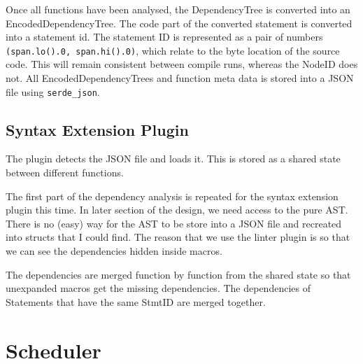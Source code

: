 Once all functions have been analysed, the DependencyTree is converted into an EncodedDependencyTree. The code part of the converted statement is converted into a statement id. The statement ID is represented as a pair of numbers \texttt{(span.lo().0, span.hi().0)}, which relate to the byte location of the source code. This will remain consistent between compile runs, whereas the NodeID does not. All EncodedDependencyTrees and function meta data is stored into a JSON file using \texttt{serde\_json}.


\subsection{Syntax Extension Plugin}

The plugin detects the JSON file and loads it. This is stored as a shared state between different functions.

The first part of the dependency analysis is repeated for the syntax extension plugin this time. In later section of the design, we need access to the pure AST. There is no (easy) way for the AST to be store into a JSON file and recreated into structs that I could find. The reason that we use the linter plugin is so that we can see the dependencies hidden inside macros.

The dependencies are merged function by function from the shared state so that unexpanded macros get the missing dependencies. The dependencies of Statements that have the same StmtID are merged together.

\section{Scheduler}

